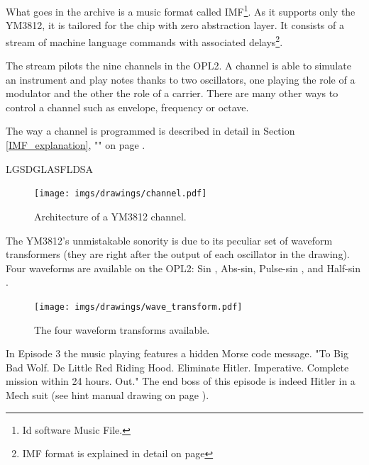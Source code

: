 \documentclass[book.tex]{subfiles}
\begin{document}
What goes in the  archive is a music format called IMF\footnote{Id software Music File.}. As it supports only the YM3812, it is tailored for the chip with zero abstraction layer. It consists of a stream of machine language commands with associated delays\footnote{IMF format is explained in detail on page \pageref{IMF_explanation}}.\\
\par
 The stream pilots the nine channels in the OPL2. A channel is able to simulate an instrument and play notes thanks to two oscillators, one playing the role of a modulator and the other the role of a carrier. There are many other ways to control a channel such as envelope, frequency or octave.\\
\par The way a channel is programmed is described in detail in Section \ref{IMF_explanation}, "" on page \pageref{IMF_explanation}.\\
\par
LGSDGLASFLDSA
\pagebreak


\begin{figure}[H]
\centering
 \texttt{[image: imgs/drawings/channel.pdf]}
 \caption{Architecture of a YM3812 channel.}
\end{figure}
\par
{}  The YM3812's unmistakable sonority is due to its peculiar set of waveform transformers (they are right after the output of each oscillator in the drawing). Four waveforms are available on the OPL2: Sin , Abs-sin, Pulse-sin , and Half-sin .
\par
\begin{figure}[H]
\centering
 \texttt{[image: imgs/drawings/wave\_transform.pdf]}
 \caption{The four waveform transforms available.}
\end{figure}


 In Episode 3 the music playing features a hidden Morse code message. "To Big Bad Wolf. De Little Red Riding Hood. Eliminate Hitler. Imperative. Complete mission within 24 hours. Out." The end boss of this episode is indeed Hitler in a Mech suit (see hint manual drawing on page \pageref{hitler_drawing}).
\end{document}
